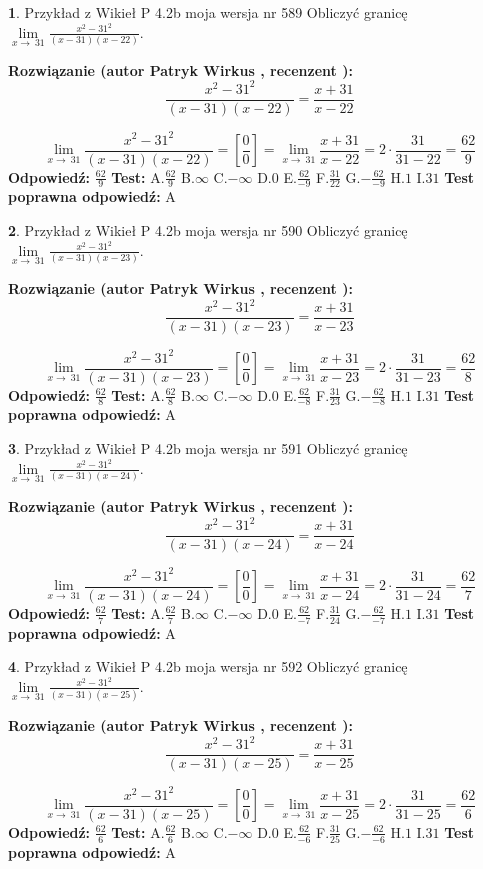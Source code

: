 \documentclass[12pt, a4paper]{article}
\theoremstyle{definition} %
\newtheorem{zad}{}
\newcommand{\zadStart}[1]{\begin{zad}#1\newline}
\newcommand{\zadStop}{\end{zad}}
\newcommand{\rozwStart}[2]{\noindent \textbf{Rozwiązanie (autor #1 , recenzent #2): }\newline}
\newcommand{\rozwStop}{\newline}
\newcommand{\odpStart}{\noindent \textbf{Odpowiedź:}\newline}
\newcommand{\odpStop}{\newline}
\newcommand{\testStart}{\noindent \textbf{Test:}\newline}
\newcommand{\testStop}{\newline}
\newcommand{\kluczStart}{\noindent \textbf{Test poprawna odpowiedź:}\newline}
\newcommand{\kluczStop}{\newline}
\begin{document}
\zadStart{Przykład z Wikieł P 4.2b moja wersja nr 589}
Obliczyć granicę $\lim\limits_{x\to\ 31}\frac{x^{2}-31^{2}}{(x-31)(x-22)}$.
\zadStop
\rozwStart{Patryk Wirkus}{}
$$\frac{x^{2}-31^{2}}{(x-31)(x-22)}=\frac{x+31}{x-22}$$

$$\lim\limits_{x\to\ 31}\frac{x^{2}-31^{2}}{(x-31)(x-22)}=[\frac{0}{0}]=\lim\limits_{x\to\ 31}\frac{x+31}{x-22}=2 \cdot \frac{31}{31-22} = \frac{62}{9}$$
\rozwStop
\odpStart
$\frac{62}{9}$
\odpStop
\testStart
A.$\frac{62}{9}$
B.$\infty$
C.$-\infty$
D.$0$
E.$\frac{62}{-9}$
F.$\frac{31}{22}$
G.$-\frac{62}{-9}$
H.$1$
I.$31$
\testStop
\kluczStart
A
\kluczStop



\zadStart{Przykład z Wikieł P 4.2b moja wersja nr 590}
Obliczyć granicę $\lim\limits_{x\to\ 31}\frac{x^{2}-31^{2}}{(x-31)(x-23)}$.
\zadStop
\rozwStart{Patryk Wirkus}{}
$$\frac{x^{2}-31^{2}}{(x-31)(x-23)}=\frac{x+31}{x-23}$$

$$\lim\limits_{x\to\ 31}\frac{x^{2}-31^{2}}{(x-31)(x-23)}=[\frac{0}{0}]=\lim\limits_{x\to\ 31}\frac{x+31}{x-23}=2 \cdot \frac{31}{31-23} = \frac{62}{8}$$
\rozwStop
\odpStart
$\frac{62}{8}$
\odpStop
\testStart
A.$\frac{62}{8}$
B.$\infty$
C.$-\infty$
D.$0$
E.$\frac{62}{-8}$
F.$\frac{31}{23}$
G.$-\frac{62}{-8}$
H.$1$
I.$31$
\testStop
\kluczStart
A
\kluczStop



\zadStart{Przykład z Wikieł P 4.2b moja wersja nr 591}
Obliczyć granicę $\lim\limits_{x\to\ 31}\frac{x^{2}-31^{2}}{(x-31)(x-24)}$.
\zadStop
\rozwStart{Patryk Wirkus}{}
$$\frac{x^{2}-31^{2}}{(x-31)(x-24)}=\frac{x+31}{x-24}$$

$$\lim\limits_{x\to\ 31}\frac{x^{2}-31^{2}}{(x-31)(x-24)}=[\frac{0}{0}]=\lim\limits_{x\to\ 31}\frac{x+31}{x-24}=2 \cdot \frac{31}{31-24} = \frac{62}{7}$$
\rozwStop
\odpStart
$\frac{62}{7}$
\odpStop
\testStart
A.$\frac{62}{7}$
B.$\infty$
C.$-\infty$
D.$0$
E.$\frac{62}{-7}$
F.$\frac{31}{24}$
G.$-\frac{62}{-7}$
H.$1$
I.$31$
\testStop
\kluczStart
A
\kluczStop



\zadStart{Przykład z Wikieł P 4.2b moja wersja nr 592}
Obliczyć granicę $\lim\limits_{x\to\ 31}\frac{x^{2}-31^{2}}{(x-31)(x-25)}$.
\zadStop
\rozwStart{Patryk Wirkus}{}
$$\frac{x^{2}-31^{2}}{(x-31)(x-25)}=\frac{x+31}{x-25}$$

$$\lim\limits_{x\to\ 31}\frac{x^{2}-31^{2}}{(x-31)(x-25)}=[\frac{0}{0}]=\lim\limits_{x\to\ 31}\frac{x+31}{x-25}=2 \cdot \frac{31}{31-25} = \frac{62}{6}$$
\rozwStop
\odpStart
$\frac{62}{6}$
\odpStop
\testStart
A.$\frac{62}{6}$
B.$\infty$
C.$-\infty$
D.$0$
E.$\frac{62}{-6}$
F.$\frac{31}{25}$
G.$-\frac{62}{-6}$
H.$1$
I.$31$
\testStop
\kluczStart
A
\kluczStop
\end{document}
